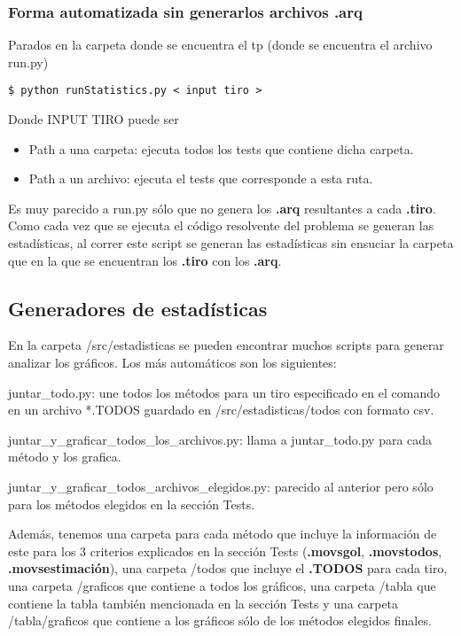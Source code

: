 \subsubsection{Forma automatizada sin generarlos archivos \textbf{.arq}}
\begin{framed}
Parados en la carpeta donde se encuentra el tp (donde se encuentra el archivo run.py)
\begin{verbatim}
$ python runStatistics.py < input tiro >
\end{verbatim}

Donde INPUT TIRO puede ser 
\begin{itemize}
	\item Path a una carpeta: ejecuta todos los tests que contiene dicha carpeta.
	\item Path a un archivo: ejecuta el tests que corresponde a esta ruta.
\end{itemize}

Es muy parecido a run.py sólo que no genera los \textbf{.arq} resultantes a cada \textbf{.tiro}. Como cada vez que se
ejecuta el código resolvente del problema se generan las estadísticas, al correr este script se
generan las estadísticas sin ensuciar la carpeta que en la que se encuentran los \textbf{.tiro} con los
\textbf{.arq}.

\end{framed}

\subsection{Generadores de estadísticas}
En la carpeta /src/estadisticas se pueden encontrar muchos scripts para generar analizar los
gráficos. Los más automáticos son los siguientes:
\begin{compactitem}
  \item juntar\_todo.py: une todos los métodos para un tiro especificado en el comando en un archivo *.TODOS guardado en
  /src/estadisticas/todos con formato csv.
\item juntar\_y\_graficar\_todos\_los\_archivos.py: llama a juntar\_todo.py para cada método y los
  grafica.
\item juntar\_y\_graficar\_todos\_archivos\_elegidos.py: parecido al anterior pero sólo para los
  métodos elegidos en la sección Tests.
\end{compactitem}

Además, tenemos una carpeta para cada método que incluye la información de este para los 3 criterios
explicados en la sección Tests (\textbf{.movsgol}, \textbf{.movstodos}, \textbf{.movsestimación}), una carpeta /todos que
incluye el \textbf{.TODOS} para cada tiro, una carpeta /graficos que contiene a todos los gráficos, una
carpeta /tabla que contiene la tabla también mencionada en la sección Tests y una carpeta
/tabla/graficos que contiene a los gráficos sólo de los métodos elegidos finales.


